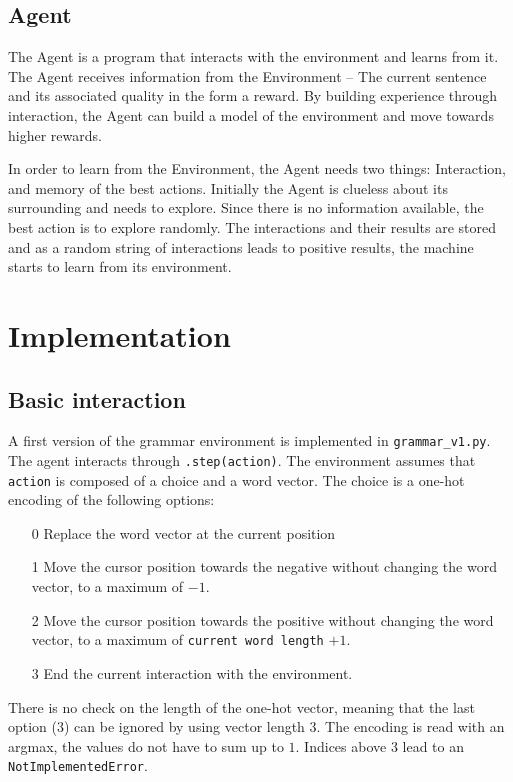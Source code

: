 \documentclass[a4paper, justified]{tufte-handout}
\begin{document}
\subsection{Agent}

The Agent is a program that interacts with the environment and learns from it. The Agent receives information from the Environment – The current sentence and its associated quality in the form a reward. By building experience through interaction, the Agent can build a model of the environment and move towards higher rewards.

In order to learn from the Environment, the Agent needs two things: Interaction, and memory of the best actions. Initially the Agent is clueless about its surrounding and needs to explore. Since there is no information available, the best action is to explore randomly. The interactions and their results are stored and as a random string of interactions leads to positive results, the machine starts to learn from its environment.\cite{thomas2018}

\section{Implementation}

\subsection{Basic interaction}

A first version of the grammar environment is implemented in \texttt{grammar\_v1.py}. The agent interacts through \texttt{.step(action)}. The environment assumes that \texttt{action} is composed of a choice and a word vector. The choice is a one-hot encoding of the following options:
\begin{itemize}
\item[0]{Replace the word vector at the current position}
\item[1]{Move the cursor position towards the negative without changing the word vector, to a maximum of $-1$.}
\item[2]{Move the cursor position towards the positive without changing the word vector, to a maximum of \texttt{current word length} $+1$.}
\item[3]{End the current interaction with the environment.}
\end{itemize}
There is no check on the length of the one-hot vector, meaning that the last option (3) can be ignored by using vector length $3$. The encoding is read with an argmax, the values do not have to sum up to $1$. Indices above 3 lead to an \texttt{NotImplementedError}.
\end{document}
